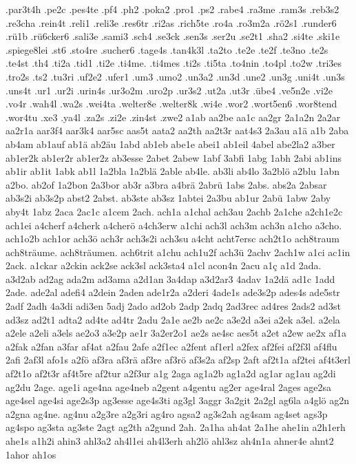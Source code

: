 {.par3t4h
.pe2c
.pes4te
.pf4
.ph2
.poka2
.pro1
.ps2
.rabe4
.ra3me
.ram3s
.reb3s2
.re3cha
.rein4t
.reli1
.reli3e
.res6tr
.ri2as
.rich5te
.ro4a
.ro3m2a
.rö2s1
.runder6
.rü1b
.rü6cker6
.sali3e
.sami3
.sch4
.se3ck
.sen3s
.ser2u
.se2t1
.sha2
.si4te
.ski1e
.spiege8lei
.st6
.sto4re
.sucher6
.tage4s
.tan4k3l
.ta2to
.te2e
.te2f
.te3no
.te2s
.te4st
.th4
.ti2a
.tid1
.ti2e
.ti4me.
.ti4mes
.ti2s
.ti5ta
.to4nin
.to4pl
.to2w
.tri3es
.tro2s
.ts2
.tu3ri
.uf2e2
.ufer1
.um3
.umo2
.un3a2
.un3d
.une2
.un3g
.uni4t
.un3s
.uns4t
.ur1
.ur2i
.urin4s
.ur3o2m
.uro2p
.ur3s2
.ut2a
.ut3r
.übe4
.ve5n2e
.vi2e
.vo4r
.wah4l
.wa2s
.wei4ta
.welter8e
.welter8k
.wi4e
.wor2
.wort5en6
.wor8tend
.wor4tu
.xe3
.ya4l
.za2s
.zi2e
.zin4st
.zwe2
a1ab
aa2be
aa1c
aa2gr
2a1a2n
2a2ar
aa2r1a
aar3f4
aar3k4
aar5sc
aas5t
aata2
aa2th
aa2t3r
aat4s3
2a3au
a1ä
a1b
2aba
ab4am
ab1auf
ab1ä
ab2äu
1abd
ab1eb
abe1e
abei1
ab1eil
4abel
abe2la2
a3ber
ab1er2k
ab1er2r
ab1er2z
ab3esse
2abet
2abew
1abf
3abfi
1abg
1abh
2abi
ab1ins
ab1ir
ab1it
1abk
ab1l
1a2bla
1a2blä
2able
ab4le.
ab3li
ab4lo
3a2blö
a2blu
1abn
a2bo.
ab2of
1a2bon
2a3bor
ab3r
a3bra
a4brä
2abrü
1abs
2abs.
abs2a
2absar
ab3s2i
ab3s2p
abst2
2abst.
ab3ste
ab3sz
1abtei
2a3bu
ab1ur
2abü
1abw
2aby
aby4t
1abz
2aca
2ac1c
a1cem
2ach.
ach1a
a1chal
ach3au
2achb
2a1che
a2ch1e2c
ach1ei
a4cherf
a4cherk
a4cherö
a4ch3erw
a1chi
ach3l
ach3m
ach3n
a1cho
a3cho.
ach1o2b
ach1or
ach3ö
ach3r
ach3s2i
ach3su
a4cht
acht7ersc
ach2t1o
ach8traum
ach8träume.
ach8träumen.
ach6trit
a1chu
ach1u2f
ach3ü
2achv
2ach1w
a1ci
ac1in
2ack.
a1ckar
a2ckin
ack2se
ack3sl
ack3sta4
a1cl
acon4n
2acu
a1ç
a1d
2ada.
a3d2ab
ad2ag
ada2m
ad3ama
a2d1an
3a4dap
a3d2ar3
4adav
1a2dä
ad1c
1add
2ade.
ade2al
adefi4
a2dein
2aden
ade1r2a
a2deri
4ade1s
ade3s2p
ades4s
ade5str
2adf
2adh
4a3di
adi3en
5adj
2ado
ad2ob
2adp
2adq
2ad3rec
ad4res
2ads2
ad3st
ad3sz
ad2t1
adta2
ad4te
ad4tr
2adu
2a1e
ae2b
ae2c
a3e2d
a3ei
a2ek
a3el.
a2ela
a2ele
a2eli
a3els
ae2o3
a3e2p
ae1r
3a2er2o1
ae2s
ae4sc
aes5t
a2et
a2ew
ae2x
af1a
a2fak
a2fan
a3far
af4at
a2fau
2afe
a2f1ec
a2fent
af1erl
a2fex
af2fei
af2f3l
af4flu
2afi
2af3l
afo1s
a2fö
af3ra
af3rä
af3re
af3rö
af3s2a
af2sp
2aft
af2t1a
af2tei
af4t3erl
af2t1o
af2t3r
af4t5re
af2tur
a2f3ur
a1g
2aga
ag1a2b
ag1a2d
ag1ar
ag1au
ag2di
ag2du
2age.
age1i
age4na
age4neb
a2gent
a4gentu
ag2er
age4ral
2ages
age2sa
age4sel
age4si
age2s3p
ag3esse
age4s3ti
ag3gl
3aggr
3a2git
2a2gl
ag6la
a4glö
ag2n
a2gna
ag4ne.
ag4nu
a2g3re
a2g3ri
ag4ro
agsa2
ag3s2ah
ag4sam
ag4set
ags3p
ag4spo
ag3sta
ag3ste
2agt
ag2th
a2gund
2ah.
2a1ha
ah4at
2a1he
ahe1in
a2h1erh
ahe1s
a1h2i
ahin3
ahl3a2
ah4l1ei
ah4l3erh
ah2lö
ahl3sz
ah4n1a
ahner4e
ahnt2
1ahor
ah1os
}
